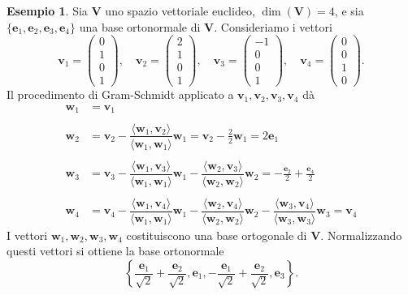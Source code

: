 \documentclass{article}
\theoremstyle{plain}
\theoremstyle{definition}
\newtheorem{exmp}{Esempio}[section]
\theoremstyle{remark}
\begin{document}
\begin{exmp}
Sia $\mathbf{V}$ uno spazio vettoriale euclideo, $\dim(\mathbf{V})=4$, e sia $\{ \mathbf{e}_1, \mathbf{e}_2, \mathbf{e}_3, \mathbf{e}_4 \}$ 
una base ortonormale di $\mathbf{V}$. Consideriamo i vettori
\[
\mathbf{v}_1 = \begin{pmatrix}0\\1\\0\\1\end{pmatrix}, \quad \mathbf{v}_2 = \begin{pmatrix}2\\1\\0\\1\end{pmatrix}, \quad \mathbf{v}_3 = \begin{pmatrix}-1\\0\\0\\1\end{pmatrix}, \quad \mathbf{v}_4 = \begin{pmatrix}0\\0\\1\\0\end{pmatrix}.
\]
Il procedimento di Gram-Schmidt applicato a $\mathbf{v}_1, \mathbf{v}_2, \mathbf{v}_3, \mathbf{v}_4$ dà
\begin{align*}
    \mathbf{w}_1&=\mathbf{v}_1\\\\
    \mathbf{w}_2&=\mathbf{v}_2-\dfrac{\langle\mathbf{w}_1,\mathbf{v}_2\rangle}{\langle\mathbf{w}_1,\mathbf{w}_1\rangle}\mathbf{w}_1=\mathbf{v}_2-\frac{2}{2}\mathbf{w}_1=2\mathbf{e}_1\\\\
    \mathbf{w}_3&=\mathbf{v}_3-\dfrac{\langle\mathbf{w}_1,\mathbf{v}_3\rangle}{\langle\mathbf{w}_1,\mathbf{w}_1\rangle}\mathbf{w}_1-\dfrac{\langle\mathbf{w}_2,\mathbf{v}_3\rangle}{\langle\mathbf{w}_2,\mathbf{w}_2\rangle}\mathbf{w}_2=-\frac{\mathbf{e}_2}{2}+\frac{\mathbf{e}_4}{2}\\\\
    \mathbf{w}_4&=\mathbf{v}_4-\dfrac{\langle\mathbf{w}_1,\mathbf{v}_4\rangle}{\langle\mathbf{w}_1,\mathbf{w}_1\rangle}\mathbf{w}_1-\dfrac{\langle\mathbf{w}_2,\mathbf{v}_4\rangle}{\langle\mathbf{w}_2,\mathbf{w}_2\rangle}\mathbf{w}_2-\dfrac{\langle\mathbf{w}_3,\mathbf{v}_4\rangle}{\langle\mathbf{w}_3,\mathbf{w}_3\rangle}\mathbf{w}_3=\mathbf{v}_4
\end{align*}
I vettori $\mathbf{w}_1, \mathbf{w}_2, \mathbf{w}_3, \mathbf{w}_4$ costituiscono una base ortogonale di $\mathbf{V}$. 
Normalizzando questi vettori si ottiene la base ortonormale
\[
\left\{ \dfrac{\mathbf{e}_1}{\sqrt{2}} + \dfrac{\mathbf{e}_2}{\sqrt{2}}, \mathbf{e}_1, -\dfrac{\mathbf{e}_1}{\sqrt{2}} + \dfrac{\mathbf{e}_2}{\sqrt{2}}, \mathbf{e}_3 \right\}.
\]
\end{exmp}
\end{document}
